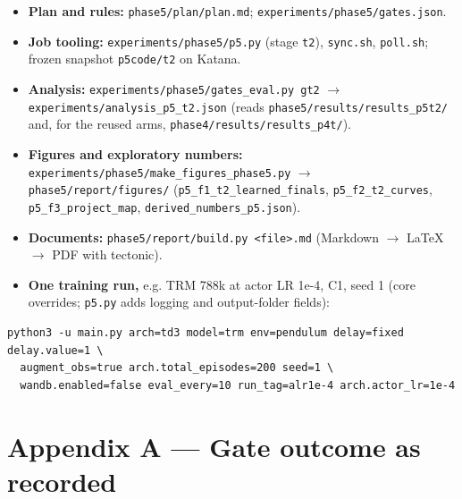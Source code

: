 \documentclass[11pt]{article}
\begin{document}
\begin{itemize}
\item \textbf{Plan and rules:} \texttt{phase5/\allowbreak{}plan/\allowbreak{}plan.\allowbreak{}md}; \texttt{experiments/\allowbreak{}phase5/\allowbreak{}gates.\allowbreak{}json}.
\item \textbf{Job tooling:} \texttt{experiments/\allowbreak{}phase5/\allowbreak{}p5.\allowbreak{}py} (stage \texttt{t2}), \texttt{sync.sh}, \texttt{poll.sh}; frozen snapshot \texttt{p5code/t2} on Katana.
\item \textbf{Analysis:} \texttt{experiments/\allowbreak{}phase5/\allowbreak{}gates\_\allowbreak{}eval.\allowbreak{}py gt2} $\rightarrow$ \texttt{experiments/\allowbreak{}analysis\_\allowbreak{}p5\_\allowbreak{}t2.\allowbreak{}json} (reads \texttt{phase5/\allowbreak{}results/\allowbreak{}results\_\allowbreak{}p5t2/\allowbreak{}} and, for the reused arms, \texttt{phase4/\allowbreak{}results/\allowbreak{}results\_\allowbreak{}p4t/\allowbreak{}}).
\item \textbf{Figures and exploratory numbers:} \texttt{experiments/\allowbreak{}phase5/\allowbreak{}make\_\allowbreak{}figures\_\allowbreak{}phase5.\allowbreak{}py} $\rightarrow$ \texttt{phase5/\allowbreak{}report/\allowbreak{}figures/\allowbreak{}} (\texttt{p5\_\allowbreak{}f1\_\allowbreak{}t2\_\allowbreak{}learned\_\allowbreak{}finals}, \texttt{p5\_\allowbreak{}f2\_\allowbreak{}t2\_\allowbreak{}curves}, \texttt{p5\_\allowbreak{}f3\_\allowbreak{}project\_\allowbreak{}map}, \texttt{derived\_\allowbreak{}numbers\_\allowbreak{}p5.\allowbreak{}json}).
\item \textbf{Documents:} \texttt{phase5/\allowbreak{}report/\allowbreak{}build.\allowbreak{}py <file>.\allowbreak{}md} (Markdown $\rightarrow$ LaTeX $\rightarrow$ PDF with tectonic).
\item \textbf{One training run,} e.g. TRM 788k at actor LR 1e-4, C1, seed 1 (core overrides; \texttt{p5.py} adds logging and output-folder fields):
\end{itemize}



{\small\begin{verbatim}
python3 -u main.py arch=td3 model=trm env=pendulum delay=fixed delay.value=1 \
  augment_obs=true arch.total_episodes=200 seed=1 \
  wandb.enabled=false eval_every=10 run_tag=alr1e-4 arch.actor_lr=1e-4
\end{verbatim}}



\section*{Appendix A --- Gate outcome as recorded}
\end{document}
